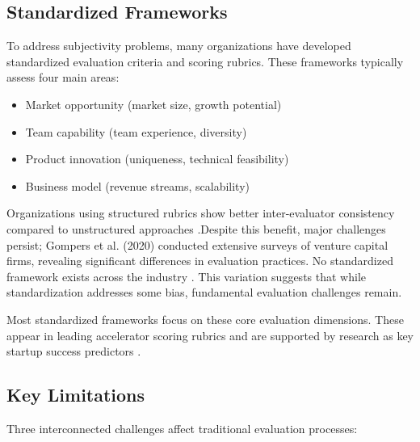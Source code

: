 \subsection{Standardized Frameworks}\label{subsec:standardized-frameworks}
To address subjectivity problems, many organizations have developed standardized evaluation criteria and scoring rubrics. These frameworks typically assess four main areas:
\begin{itemize}
    \item Market opportunity (market size, growth potential)
    \item Team capability (team experience, diversity)
    \item Product innovation (uniqueness, technical feasibility)
    \item Business model (revenue streams, scalability)
\end{itemize}

Organizations using structured rubrics show better inter-evaluator consistency compared to unstructured approaches \cite{Tsay2021VISUALSDI}.Despite this benefit, major challenges persist; Gompers et al. (2020) conducted extensive surveys of venture capital firms, revealing significant differences in evaluation practices. No standardized framework exists across the industry \cite{Gompers2020}. This variation suggests that while standardization addresses some bias, fundamental evaluation challenges remain.

Most standardized frameworks focus on these core evaluation dimensions. These appear in leading accelerator scoring rubrics and are supported by research as key startup success predictors \cite{Kalvapalle2024}.

\subsection{Key Limitations}\label{subsec:key-limitations}
Three interconnected challenges affect traditional evaluation processes:


